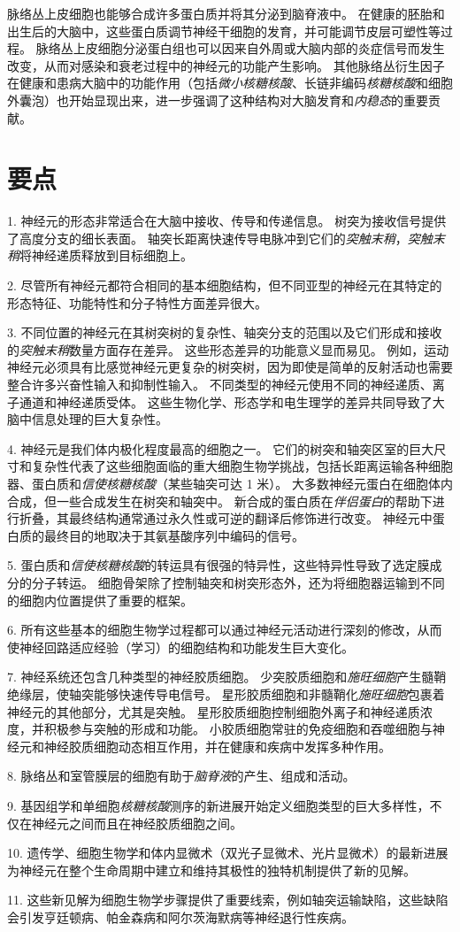 脉络丛上皮细胞也能够合成许多蛋白质并将其分泌到脑脊液中。
在健康的胚胎和出生后的大脑中，这些蛋白质调节神经干细胞的发育，并可能调节皮层可塑性等过程。
脉络丛上皮细胞分泌蛋白组也可以因来自外周或大脑内部的炎症信号而发生改变，从而对感染和衰老过程中的神经元的功能产生影响。
其他脉络丛衍生因子在健康和患病大脑中的功能作用（包括\textit{微小核糖核酸}、长链非编码\textit{核糖核酸}和细胞外囊泡）也开始显现出来，进一步强调了这种结构对大脑发育和\textit{内稳态}的重要贡献。



\section{要点}

1. 神经元的形态非常适合在大脑中接收、传导和传递信息。
树突为接收信号提供了高度分支的细长表面。
轴突长距离快速传导电脉冲到它们的\textit{突触末稍}，\textit{突触末稍}将神经递质释放到目标细胞上。


2. 尽管所有神经元都符合相同的基本细胞结构，但不同亚型的神经元在其特定的形态特征、功能特性和分子特性方面差异很大。


3. 不同位置的神经元在其树突树的复杂性、轴突分支的范围以及它们形成和接收的\textit{突触末稍}数量方面存在差异。
这些形态差异的功能意义显而易见。
例如，运动神经元必须具有比感觉神经元更复杂的树突树，因为即使是简单的反射活动也需要整合许多兴奋性输入和抑制性输入。
不同类型的神经元使用不同的神经递质、离子通道和神经递质受体。
这些生物化学、形态学和电生理学的差异共同导致了大脑中信息处理的巨大复杂性。


4. 神经元是我们体内极化程度最高的细胞之一。
它们的树突和轴突区室的巨大尺寸和复杂性代表了这些细胞面临的重大细胞生物学挑战，包括长距离运输各种细胞器、蛋白质和\textit{信使核糖核酸}（某些轴突可达 1 米）。
大多数神经元蛋白在细胞体内合成，但一些合成发生在树突和轴突中。
新合成的蛋白质在\textit{伴侣蛋白}的帮助下进行折叠，其最终结构通常通过永久性或可逆的翻译后修饰进行改变。
神经元中蛋白质的最终目的地取决于其氨基酸序列中编码的信号。


5. 蛋白质和\textit{信使核糖核酸}的转运具有很强的特异性，这些特异性导致了选定膜成分的分子转运。
细胞骨架除了控制轴突和树突形态外，还为将细胞器运输到不同的细胞内位置提供了重要的框架。


6. 所有这些基本的细胞生物学过程都可以通过神经元活动进行深刻的修改，从而使神经回路适应经验（学习）的细胞结构和功能发生巨大变化。


7. 神经系统还包含几种类型的神经胶质细胞。
少突胶质细胞和\textit{施旺细胞}产生髓鞘绝缘层，使轴突能够快速传导电信号。
星形胶质细胞和非髓鞘化\textit{施旺细胞}包裹着神经元的其他部分，尤其是突触。 
星形胶质细胞控制细胞外离子和神经递质浓度，并积极参与突触的形成和功能。
小胶质细胞常驻的免疫细胞和吞噬细胞与神经元和神经胶质细胞动态相互作用，并在健康和疾病中发挥多种作用。


8. 脉络丛和室管膜层的细胞有助于\textit{脑脊液}的产生、组成和活动。


9. 基因组学和单细胞\textit{核糖核酸}测序的新进展开始定义细胞类型的巨大多样性，不仅在神经元之间而且在神经胶质细胞之间。


10. 遗传学、细胞生物学和体内显微术（双光子显微术、光片显微术）的最新进展为神经元在整个生命周期中建立和维持其极性的独特机制提供了新的见解。


11. 这些新见解为细胞生物学步骤提供了重要线索，例如轴突运输缺陷，这些缺陷会引发亨廷顿病、帕金森病和阿尔茨海默病等神经退行性疾病。



